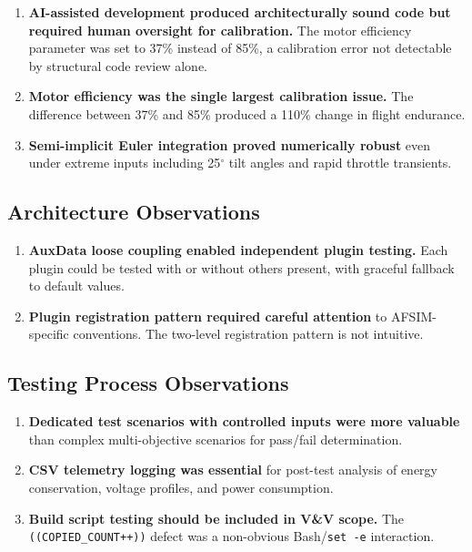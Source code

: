 \documentclass[11pt, letterpaper]{article}
\begin{document}
\begin{enumerate}
    \item \unclass \textbf{AI-assisted development produced architecturally sound code but required human oversight for calibration.} The motor efficiency parameter was set to 37\% instead of 85\%, a calibration error not detectable by structural code review alone.
    \item \unclass \textbf{Motor efficiency was the single largest calibration issue.} The difference between 37\% and 85\% produced a 110\% change in flight endurance.
    \item \unclass \textbf{Semi-implicit Euler integration proved numerically robust} even under extreme inputs including 25$^\circ$ tilt angles and rapid throttle transients.
\end{enumerate}

\subsection{\unclass Architecture Observations}

\begin{enumerate}[start=4]
    \item \unclass \textbf{AuxData loose coupling enabled independent plugin testing.} Each plugin could be tested with or without others present, with graceful fallback to default values.
    \item \unclass \textbf{Plugin registration pattern required careful attention} to AFSIM-specific conventions. The two-level registration pattern is not intuitive.
\end{enumerate}

\subsection{\unclass Testing Process Observations}

\begin{enumerate}[start=6]
    \item \unclass \textbf{Dedicated test scenarios with controlled inputs were more valuable} than complex multi-objective scenarios for pass/fail determination.
    \item \unclass \textbf{CSV telemetry logging was essential} for post-test analysis of energy conservation, voltage profiles, and power consumption.
    \item \unclass \textbf{Build script testing should be included in V\&V scope.} The \texttt{((COPIED\_COUNT++))} defect was a non-obvious Bash/\texttt{set -e} interaction.
\end{enumerate}
\end{document}
